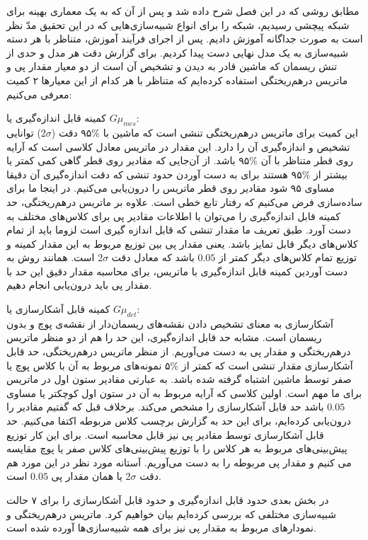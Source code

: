   مطابق روشی که در این فصل شرح داده شد و پس از آن که به یک معماری بهینه برای شبکه پیچشی رسیدیم، شبکه را برای انواع شبیه‌سازی‌هایی که در این تحقیق مدّ نظر است به صورت جداگانه آموزش دادیم. پس از اجرای فرآیند آموزش، متناظر با هر دسته شبیه‌سازی به یک مدل نهایی دست پیدا کردیم. برای گزارش دقت هر مدل و حدی از تنش ریسمان که ماشین قادر به دیدن و تشخیص آن است از دو معیار مقدار پی و ماتریس درهم‌ریختگی استفاده کرده‌ایم که متناظر با هر کدام از این معیارها ۲ کمیت معرفی می‌کنیم:
  \begin{description}
  	\item
  	کمینه قابل اندازه‌گیری یا $G\mu_{mes}$:\\
  	این کمیت برای ماتریس درهم‌ریختگی تنشی است که ماشین با $\%$۹۵ دقت ($\sigma$2) توانایی تشخیص و اندازه‌گیری آن را دارد. این مقدار در ماتریس معادل کلاسی است که آرایه روی قطر متناظر با آن $\%$۹۵ باشد. از آن‌جایی که مقادیر روی قطر گاهی کمی کمتر یا بیشتر از $\%$۹۵ هستند برای به دست آوردن حدود تنشی که دقت اندازه‌گیری آن دقیقا مساوی ۹۵ شود مقادیر روی قطر ماتریس را درون‌یابی می‌کنیم. در اینجا ما برای ساده‌سازی فرض می‌کنیم که رفتار تابع خطی است.
  	علاوه بر ماتریس درهم‌ریختگی، حد کمینه قابل اندازه‌گیری را می‌توان با اطلاعات مقادیر پی برای کلاس‌های مختلف به دست آورد. طبق تعریف ما مقدار تنشی که قابل اندازه گیری است لزوما باید از تمام کلاس‌های دیگر قابل تمایز باشد. یعنی مقدار پی بین توزیع مربوط به این مقدار کمینه و توزیع تمام کلاس‌های دیگر کمتر از $0.05$ باشد که معادل دقت $\sigma$2 است. همانند روش به دست آوردین کمینه قابل اندازه‌گیری با ماتریس، برای محاسبه مقدار دقیق این حد با مقدار پی باید درون‌یابی انجام دهیم.     
  	\item
  	کمینه قابل آشکارسازی یا $G\mu_{det}$:\\
  	آشکارسازی به معنای تشخیص دادن نقشه‌های ریسمان‌دار از نقشه‌ی پوچ و بدون ریسمان است. مشابه حد قابل اندازه‌گیری، این حد را هم از دو منظر ماتریس درهم‌ریختگی و مقدار پی به دست می‌آوریم. از منظر ماتریس درهم‌ریختگی، حد قابل آشکارسازی مقدار تنشی است که کمتر از $\%$۵ نمونه‌های مربوط به آن با کلاس پوچ یا صفر توسط ماشین اشتباه گرفته شده باشد. به عبارتی مقادیر ستون اول در ماتریس برای ما مهم است. اولین کلاسی که آرایه مربوط به آن در ستون اول کوچکتر یا مساوی $0.05$ باشد حد قابل آشکارسازی را مشخص می‌کند. برخلاف قبل که گفتیم مقادیر را درون‌یابی کرده‌ایم، برای این حد به گزارش برچسب کلاس مربوطه اکتفا می‌کنیم. حد قابل آشکارسازی توسط مقادیر پی نیز قابل محاسبه است. برای این کار توزیع پیش‌بینی‌های مربوط به هر کلاس را با توزیع پیش‌بینی‌های کلاس صفر یا پوچ مقایسه می کنیم و مقدار پی مربوطه را به دست می‌آوریم. آستانه مورد نظر در این مورد هم دقت $\sigma$2 یا همان مقدار پی $0.05$ است.   	    
  \end{description}
  در بخش بعدی حدود قابل اندازه‌گیری و حدود قابل آشکارسازی را برای ۷ حالت شبیه‌سازی مختلفی که بررسی کرده‌ایم بیان خواهیم کرد. ماتریس در‌هم‌ریختگی و نمودار‌های مربوط به مقدار پی نیز برای همه شبیه‌سازی‌ها آورده شده است.  
